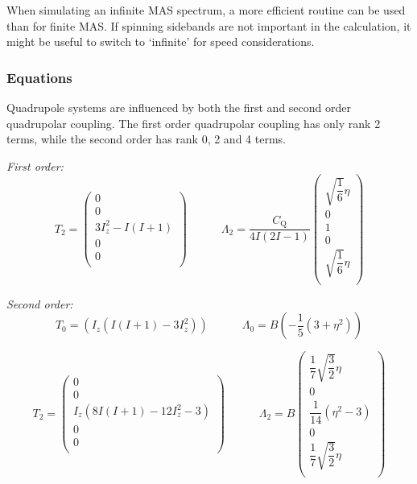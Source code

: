 \documentclass[11pt,a4paper]{article}
\begin{document}
When simulating an infinite MAS spectrum, a more efficient routine can be used than for finite MAS.
If spinning sidebands are not important in the calculation, it might be useful to switch to
`infinite' for speed considerations.







\subsubsection*{Equations}
Quadrupole systems are influenced by both the first and second order quadrupolar coupling. The first
order quadrupolar coupling has only rank 2 terms, while the second order has rank 0, 2 and 4
terms.

\textit{First order:}
\begin{equation}
  T_{2} = \left( \begin{array}{c}
0 \\
0 \\
3 I_z^2 - I (I+1) \\
0 \\
0\\
  \end{array} \right)
  \quad\quad\quad
  \Lambda_2 = \dfrac{C_\text{Q}}{4  I (2 I - 1)} \left( \begin{array}{c}
  \sqrt{\dfrac{1}{6}} \eta\\
  0\\
  1\\
  0\\
  \sqrt{\dfrac{1}{6}} \eta\\
  \end{array} \right)
\end{equation}


\textit{Second order:}
\begin{equation}
  T_{0} = \left( I_z (I(I+1)-3 I_z^2) \right)
  \quad\quad\quad
  \Lambda_{0} = B \left( -\dfrac{1}{5} (3 + \eta^2) \right)
\end{equation}

\begin{equation}
  T_{2} = \left( \begin{array}{c}
0 \\
0 \\
I_z (8 I (I + 1) -12 I_z^2 - 3) \\
0 \\
0\\
  \end{array} \right)
  \quad\quad\quad
  \Lambda_{2} = B \left( \begin{array}{c}
\dfrac{1}{7} \sqrt{\dfrac{3}{2}} \eta \\
0 \\
\dfrac{1}{14} (\eta^2 - 3) \\
0 \\
\dfrac{1}{7} \sqrt{\dfrac{3}{2}} \eta\\
  \end{array} \right)
\end{equation}
\end{document}
